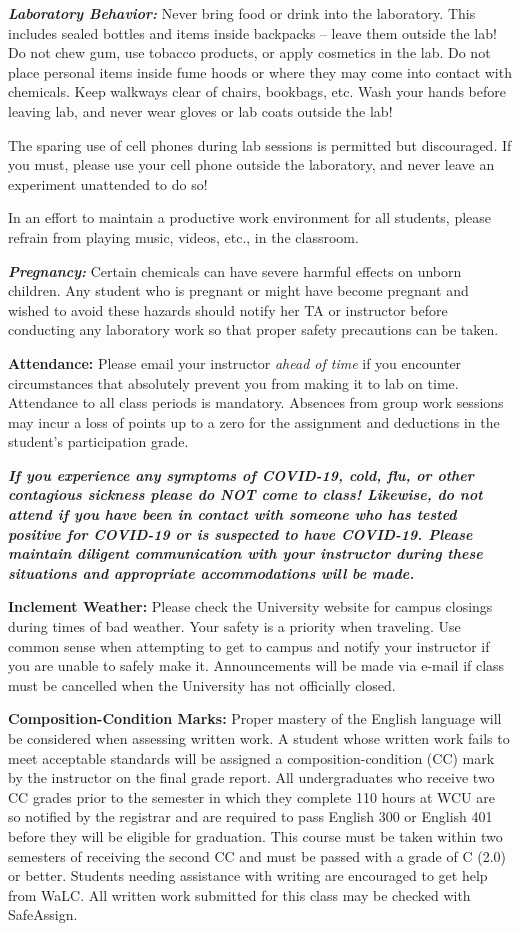 \documentclass[]{tufte-book}
\begin{document}
\textbf{\emph{Laboratory Behavior:}} Never bring food or drink into the laboratory. This includes sealed bottles and items inside backpacks -- leave them outside the lab! Do not chew gum, use tobacco products, or apply cosmetics in the lab. Do not place personal items inside fume hoods or where they may come into contact with chemicals. Keep walkways clear of chairs, bookbags, etc. Wash your hands before leaving lab, and never wear gloves or lab coats outside the lab!

The sparing use of cell phones during lab sessions is permitted but discouraged. If you must, please use your cell phone outside the laboratory, and never leave an experiment unattended to do so!

In an effort to maintain a productive work environment for all students, please refrain from playing music, videos, etc., in the classroom.

\textbf{\emph{Pregnancy:}} Certain chemicals can have severe harmful effects on unborn children. Any student who is pregnant or might have become pregnant and wished to avoid these hazards should notify her TA or instructor before conducting any laboratory work so that proper safety precautions can be taken.

\textbf{Attendance:} Please email your instructor \emph{ahead of time} if you encounter circumstances that absolutely prevent you from making it to lab on time. Attendance to all class periods is mandatory. Absences from group work sessions may incur a loss of points up to a zero for the assignment and deductions in the student's participation grade.

\textbf{\emph{If you experience any symptoms of COVID-19, cold, flu, or other contagious sickness please do NOT come to class! Likewise, do not attend if you have been in contact with someone who has tested positive for COVID-19 or is suspected to have COVID-19. Please maintain diligent communication with your instructor during these situations and appropriate accommodations will be made.}}

\textbf{Inclement Weather:} Please check the University website for campus closings during times of bad weather. Your safety is a priority when traveling. Use common sense when attempting to get to campus and notify your instructor if you are unable to safely make it. Announcements will be made via e-mail if class must be cancelled when the University has not officially closed.

\textbf{Composition-Condition Marks:} Proper mastery of the English language will be considered when assessing written work. A student whose written work fails to meet acceptable standards will be assigned a composition-condition (CC) mark by the instructor on the final grade report. All undergraduates who receive two CC grades prior to the semester in which they complete 110 hours at WCU are so notified by the registrar and are required to pass English 300 or English 401 before they will be eligible for graduation. This course must be taken within two semesters of receiving the second CC and must be passed with a grade of C (2.0) or better. Students needing assistance with writing are encouraged to get help from WaLC. All written work submitted for this class may be checked with SafeAssign.
\end{document}
